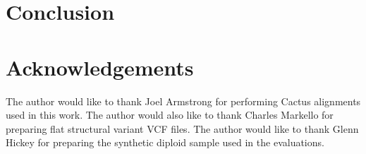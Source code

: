 \section{Conclusion}

\section{Acknowledgements}

The author would like to thank Joel Armstrong for performing Cactus alignments used in this work. The author would also like to thank Charles Markello for preparing flat structural variant VCF files. The author would like to thank Glenn Hickey for preparing the synthetic diploid sample used in the evaluations.

        
            
